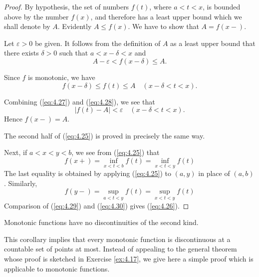 \begin{proof}
    By hypothesis, the set of numbers $f(t)$, where $a< t < x$,
    is bounded above by the number $f(x)$,
    and therefore has a least upper bound which we shall denote by $A$.
    Evidently $A \leq f(x)$. We have to show that $A =f(x-)$.

    Let $\varepsilon > 0$ be given.
    It follows from the definition of $A$
    as a least upper bound that there exists $\delta > 0$
    such that $a < x - \delta < x$ and
    \begin{equation}
        \label{eq:4.27}
        A - \varepsilon < f(x - \delta) \leq A.
    \end{equation}

    Since $f$ is monotonic, we have
    \begin{equation}
        \label{eq:4.28}
        f(x-\delta) \leq f(t) \leq A
        \quad
        (x-\delta < t < x).
    \end{equation}

    Combining (\ref{eq:4.27}) and (\ref{eq:4.28}), we see that
    \begin{equation*}
        \left| f(t) - A \right| < \varepsilon
        \quad
        (x - \delta < t < x).
    \end{equation*}
    Hence $f(x-) = A$.

    The second half of (\ref{eq:4.25}) is proved in precisely the same way.

    Next, if $a < x < y < b$, we see from (\ref{eq:4.25}) that
    \begin{equation}
        \label{eq:4.29}
        f(x+)
        = \inf_{x < t < b} f(t)
        = \inf_{x < t < y} f(t)
    \end{equation}
    The last equality is obtained by applying (\ref{eq:4.25}) to $(a, y)$ in place of $(a, b)$.
    Similarly,
    \begin{equation}
        \label{eq:4.30}
        f(y-)
        = \sup_{a < t < y} f(t)
        = \sup_{x < t < y} f(t)
    \end{equation}
    Comparison of (\ref{eq:4.29}) and (\ref{eq:4.30}) gives (\ref{eq:4.26}).
\end{proof}

\begin{myCorollary*}
    Monotonic functions have no discontinuities of the second kind.
\end{myCorollary*}

This corollary implies that every monotonic function is discontinuous at a countable set of points at most.
Instead of appealing to the general theorem whose proof is sketched in Exercise \ref{ex:4.17},
we give here a simple proof which is applicable to monotonic functions.

